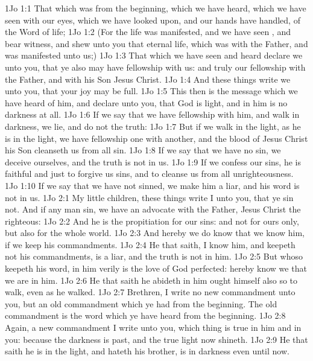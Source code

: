 \vs 1Jo 1:1 That which was from the beginning, which we have heard, which we have seen with our eyes, which we have looked upon, and our hands have handled, of the Word of life;
\vs 1Jo 1:2 (For the life was manifested, and we have seen , and bear witness, and shew unto you that eternal life, which was with the Father, and was manifested unto us;)
\vs 1Jo 1:3 That which we have seen and heard declare we unto you, that ye also may have fellowship with us: and truly our fellowship  with the Father, and with his Son Jesus Christ.
\vs 1Jo 1:4 And these things write we unto you, that your joy may be full.
\vs 1Jo 1:5 This then is the message which we have heard of him, and declare unto you, that God is light, and in him is no darkness at all.
\vs 1Jo 1:6 If we say that we have fellowship with him, and walk in darkness, we lie, and do not the truth:
\vs 1Jo 1:7 But if we walk in the light, as he is in the light, we have fellowship one with another, and the blood of Jesus Christ his Son cleanseth us from all sin.
\vs 1Jo 1:8 If we say that we have no sin, we deceive ourselves, and the truth is not in us.
\vs 1Jo 1:9 If we confess our sins, he is faithful and just to forgive us  sins, and to cleanse us from all unrighteousness.
\vs 1Jo 1:10 If we say that we have not sinned, we make him a liar, and his word is not in us.
\vs 1Jo 2:1 My little children, these things write I unto you, that ye sin not. And if any man sin, we have an advocate with the Father, Jesus Christ the righteous:
\vs 1Jo 2:2 And he is the propitiation for our sins: and not for ours only, but also for  the whole world.
\vs 1Jo 2:3 And hereby we do know that we know him, if we keep his commandments.
\vs 1Jo 2:4 He that saith, I know him, and keepeth not his commandments, is a liar, and the truth is not in him.
\vs 1Jo 2:5 But whoso keepeth his word, in him verily is the love of God perfected: hereby know we that we are in him.
\vs 1Jo 2:6 He that saith he abideth in him ought himself also so to walk, even as he walked.
\vs 1Jo 2:7 Brethren, I write no new commandment unto you, but an old commandment which ye had from the beginning. The old commandment is the word which ye have heard from the beginning.
\vs 1Jo 2:8 Again, a new commandment I write unto you, which thing is true in him and in you: because the darkness is past, and the true light now shineth.
\vs 1Jo 2:9 He that saith he is in the light, and hateth his brother, is in darkness even until now.
